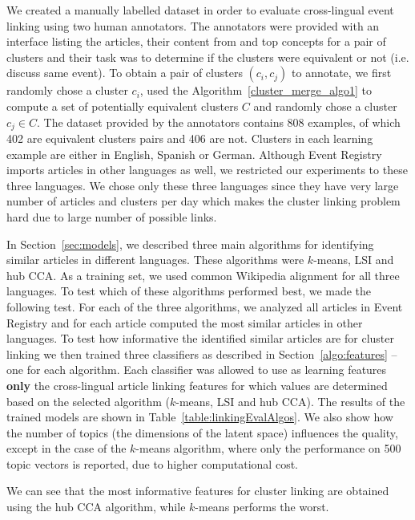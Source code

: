 \documentclass[twoside,11pt]{article}
\begin{document}
We created a manually labelled dataset in order to evaluate cross-lingual event linking using two human annotators. The annotators were provided with an interface listing the articles, their content from and top concepts for a pair of clusters and their task was to determine if the clusters were equivalent or not (i.e. discuss same event). To obtain a pair of clusters $(c_i, c_j)$ to annotate, we first randomly chose a cluster $c_i$, used the Algorithm~\ref{cluster_merge_algo1} to compute a set of potentially equivalent clusters $C$ and randomly chose a cluster $c_j \in C$. The dataset provided by the annotators contains 808 examples, of which 402 are equivalent clusters pairs and 406 are not. Clusters in each learning example are either in English, Spanish or German. Although Event Registry imports articles in other languages as well, we restricted our experiments to these three languages. We chose only these three languages since they have very large number of articles and clusters per day which makes the cluster linking problem hard due to large number of possible links.

In Section~\ref{sec:models}, we  described three main algorithms for identifying similar articles in different languages. These algorithms were $k$-means, LSI and hub CCA. As a training set, we used common Wikipedia alignment for all three languages. To test which of these algorithms performed best, we made the following test. For each of the three algorithms, we analyzed all articles in Event Registry and for each article computed the most similar articles in other languages. To test how informative the identified similar articles are for cluster linking we then trained three classifiers as described in Section~\ref{algo:features} -- one for each algorithm. Each classifier was allowed to use as learning features \textbf{only} the cross-lingual article linking features for which values are determined based on the selected algorithm ($k$-means, LSI and hub CCA). The results of the trained models are shown in Table~\ref{table:linkingEvalAlgos}. We also show how the number of topics (the dimensions of the latent space) influences the quality, except in the case of the $k$-means algorithm, where only the performance on 500 topic vectors is reported, due to higher computational cost.

We can see that the most informative features for cluster linking are obtained using the hub CCA algorithm, while $k$-means performs the worst.
\end{document}
